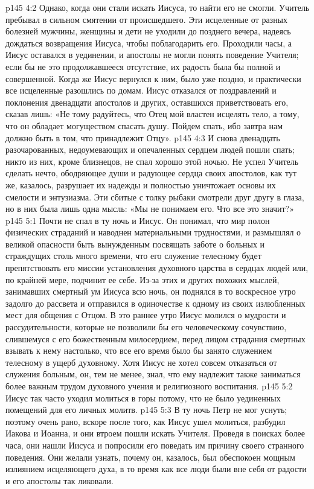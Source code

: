 \vs p145 4:2 Однако, когда они стали искать Иисуса, то найти его не смогли. Учитель пребывал в сильном смятении от происшедшего. Эти исцеленные от разных болезней мужчины, женщины и дети не уходили до позднего вечера, надеясь дождаться возвращения Иисуса, чтобы поблагодарить его. Проходили часы, а Иисус оставался в уединении, и апостолы не могли понять поведение Учителя; если бы не это продолжавшееся отсутствие, их радость была бы полной и совершенной. Когда же Иисус вернулся к ним, было уже поздно, и практически все исцеленные разошлись по домам. Иисус отказался от поздравлений и поклонения двенадцати апостолов и других, оставшихся приветствовать его, сказав лишь: «Не тому радуйтесь, что Отец мой властен исцелять тело, а тому, что он обладает могуществом спасать душу. Пойдем спать, ибо завтра нам должно быть в том, что принадлежит Отцу».
\vs p145 4:3 И снова двенадцать разочарованных, недоумевающих и опечаленных сердцем людей пошли спать; никто из них, кроме близнецов, не спал хорошо этой ночью. Не успел Учитель сделать нечто, ободряющее души и радующее сердца своих апостолов, как тут же, казалось, разрушает их надежды и полностью уничтожает основы их смелости и энтузиазма. Эти сбитые с толку рыбаки смотрели друг другу в глаза, но в них была лишь одна мысль: «Мы не понимаем его. Что все это значит?»
\vs p145 5:1 Почти не спал в ту ночь и Иисус. Он понимал, что мир полон физических страданий и наводнен материальными трудностями, и размышлял о великой опасности быть вынужденным посвящать заботе о больных и страждущих столь много времени, что его служение телесному будет препятствовать его миссии установления духовного царства в сердцах людей или, по крайней мере, подчинит ее себе. Из\hyp{}за этих и других похожих мыслей, занимавших смертный ум Иисуса всю ночь, он поднялся в то воскресное утро задолго до рассвета и отправился в одиночестве к одному из своих излюбленных мест для общения с Отцом. В это раннее утро Иисус молился о мудрости и рассудительности, которые не позволили бы его человеческому сочувствию, слившемуся с его божественным милосердием, перед лицом страдания смертных взывать к нему настолько, что все его время было бы занято служением телесному в ущерб духовному. Хотя Иисус не хотел совсем отказаться от служения больным, он, тем не менее, знал, что ему надлежит также заниматься более важным трудом духовного учения и религиозного воспитания.
\vs p145 5:2 Иисус так часто уходил молиться в горы потому, что не было уединенных помещений для его личных молитв.
\vs p145 5:3 В ту ночь Петр не мог уснуть; поэтому очень рано, вскоре после того, как Иисус ушел молиться, разбудил Иакова и Иоанна, и они втроем пошли искать Учителя. Проведя в поисках более часа, они нашли Иисуса и попросили его поведать им причину своего странного поведения. Они желали узнать, почему он, казалось, был обеспокоен мощным излиянием исцеляющего духа, в то время как все люди были вне себя от радости и его апостолы так ликовали.
